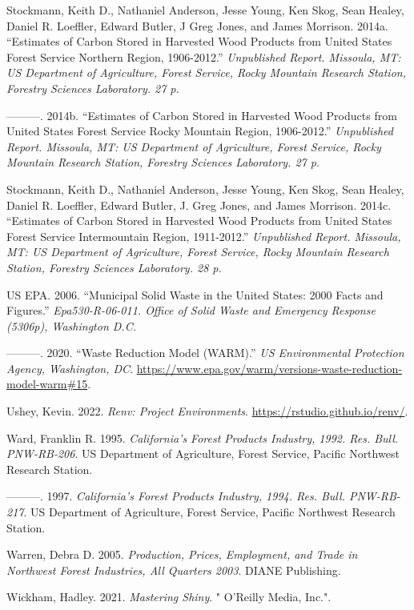 \documentclass[
  openany]{book}
\newlength{\cslhangindent}
\newlength{\cslentryspacingunit} %
\newenvironment{CSLReferences}[2] %
 {%
  \setlength{\parindent}{0pt}
  \ifodd #1
  \let\oldpar\par
  \def\par{\hangindent=\cslhangindent\oldpar}
  \fi
  \setlength{\parskip}{#2\cslentryspacingunit}
 }%
 {}
\begin{document}
\begin{CSLReferences}{1}{0}
\leavevmode{}%
Stockmann, Keith D., Nathaniel Anderson, Jesse Young, Ken Skog, Sean
Healey, Daniel R. Loeffler, Edward Butler, J Greg Jones, and James
Morrison. 2014a. {``Estimates of Carbon Stored in Harvested Wood
Products from United States Forest Service Northern Region,
1906-2012.''} \emph{Unpublished Report. Missoula, MT: US Department of
Agriculture, Forest Service, Rocky Mountain Research Station, Forestry
Sciences Laboratory. 27 p.}

\leavevmode{}%
---------. 2014b. {``Estimates of Carbon Stored in Harvested Wood
Products from United States Forest Service Rocky Mountain Region,
1906-2012.''} \emph{Unpublished Report. Missoula, MT: US Department of
Agriculture, Forest Service, Rocky Mountain Research Station, Forestry
Sciences Laboratory. 27 p.}

\leavevmode{}%
Stockmann, Keith D., Nathaniel Anderson, Jesse Young, Ken Skog, Sean
Healey, Daniel R. Loeffler, Edward Butler, J. Greg Jones, and James
Morrison. 2014c. {``Estimates of Carbon Stored in Harvested Wood
Products from United States Forest Service Intermountain Region,
1911-2012.''} \emph{Unpublished Report. Missoula, MT: US Department of
Agriculture, Forest Service, Rocky Mountain Research Station, Forestry
Sciences Laboratory. 28 p.}

\leavevmode{}%
US EPA. 2006. {``Municipal Solid Waste in the United States: 2000 Facts
and Figures.''} \emph{Epa530-R-06-011. Office of Solid Waste and
Emergency Response (5306p), Washington D.C.}

\leavevmode{}%
---------. 2020. {``Waste Reduction Model (WARM).''} \emph{US
Environmental Protection Agency, Washington, DC}.
\url{https://www.epa.gov/warm/versions-waste-reduction-model-warm\#15}.

\leavevmode{}%
Ushey, Kevin. 2022. \emph{Renv: Project Environments}.
\url{https://rstudio.github.io/renv/}.

\leavevmode{}%
Ward, Franklin R. 1995. \emph{California's Forest Products Industry,
1992. Res. Bull. PNW-RB-206}. US Department of Agriculture, Forest
Service, Pacific Northwest Research Station.

\leavevmode{}%
---------. 1997. \emph{California's Forest Products Industry, 1994. Res.
Bull. PNW-RB-217}. US Department of Agriculture, Forest Service, Pacific
Northwest Research Station.

\leavevmode{}%
Warren, Debra D. 2005. \emph{Production, Prices, Employment, and Trade
in Northwest Forest Industries, All Quarters 2003}. DIANE Publishing.

\leavevmode{}%
Wickham, Hadley. 2021. \emph{Mastering Shiny}. " O'Reilly Media, Inc.".

\end{CSLReferences}

\backmatter
\end{document}
